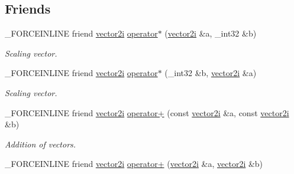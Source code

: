 \subsection*{Friends}
\begin{DoxyCompactItemize}
\item 
\hypertarget{classbt_1_1vector2i_a92605db6edf9aab743a6f963c2bffbcb}{\-\_\-\-F\-O\-R\-C\-E\-I\-N\-L\-I\-N\-E friend \hyperlink{classbt_1_1vector2i}{vector2i} \hyperlink{classbt_1_1vector2i_a92605db6edf9aab743a6f963c2bffbcb}{operator$\ast$} (\hyperlink{classbt_1_1vector2i}{vector2i} \&a, \-\_\-int32 \&b)}\label{classbt_1_1vector2i_a92605db6edf9aab743a6f963c2bffbcb}

\begin{DoxyCompactList}\small\item\em Scaling vector. \end{DoxyCompactList}\item 
\hypertarget{classbt_1_1vector2i_a701605b535332a9fc652ccbbd602a3d7}{\-\_\-\-F\-O\-R\-C\-E\-I\-N\-L\-I\-N\-E friend \hyperlink{classbt_1_1vector2i}{vector2i} \hyperlink{classbt_1_1vector2i_a701605b535332a9fc652ccbbd602a3d7}{operator$\ast$} (\-\_\-int32 \&b, \hyperlink{classbt_1_1vector2i}{vector2i} \&a)}\label{classbt_1_1vector2i_a701605b535332a9fc652ccbbd602a3d7}

\begin{DoxyCompactList}\small\item\em Scaling vector. \end{DoxyCompactList}\item 
\hypertarget{classbt_1_1vector2i_a0461ea39ff3d08e6945422172c10a023}{\-\_\-\-F\-O\-R\-C\-E\-I\-N\-L\-I\-N\-E friend \hyperlink{classbt_1_1vector2i}{vector2i} \hyperlink{classbt_1_1vector2i_a0461ea39ff3d08e6945422172c10a023}{operator+} (const \hyperlink{classbt_1_1vector2i}{vector2i} \&a, const \hyperlink{classbt_1_1vector2i}{vector2i} \&b)}\label{classbt_1_1vector2i_a0461ea39ff3d08e6945422172c10a023}

\begin{DoxyCompactList}\small\item\em Addition of vectors. \end{DoxyCompactList}\item 
\hypertarget{classbt_1_1vector2i_a33cf28952e1655945ba132fcc9480548}{\-\_\-\-F\-O\-R\-C\-E\-I\-N\-L\-I\-N\-E friend \hyperlink{classbt_1_1vector2i}{vector2i} \hyperlink{classbt_1_1vector2i_a33cf28952e1655945ba132fcc9480548}{operator+} (\hyperlink{classbt_1_1vector2i}{vector2i} \&a, \hyperlink{classbt_1_1vector2i}{vector2i} \&b)}\label{classbt_1_1vector2i_a33cf28952e1655945ba132fcc9480548}


\end{DoxyCompactItemize}
